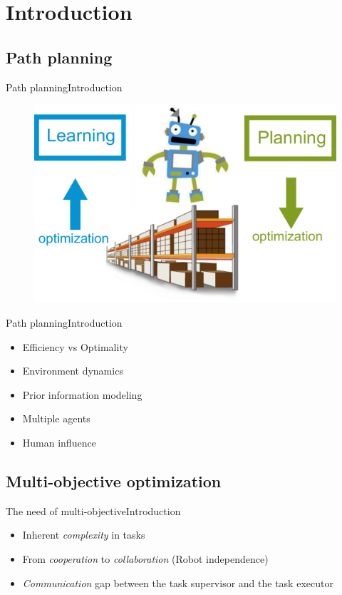 \section{Introduction}

\subsection{Path planning}

\begin{frame}{Path planning}{Introduction}
	\begin{figure}
		\centering
		\includegraphics[width=.7\linewidth]{figure/robot_interaction}
		\label{fig:robot}
	\end{figure}
 \end{frame}

\begin{frame}{Path planning}{Introduction}
\begin{itemize}
\item Efficiency vs Optimality
\item Environment dynamics
\item Prior information modeling
\item Multiple agents
\item Human influence
\end{itemize}
\end{frame}

\subsection{Multi-objective optimization}

\begin{frame}{The need of multi-objective}{Introduction}
\begin{itemize}
\item Inherent {\em complexity} in tasks
\item From {\em cooperation} to {\em collaboration} (Robot independence)
\item {\em Communication} gap between the task supervisor and the task executor
\end{itemize}
\end{frame}

